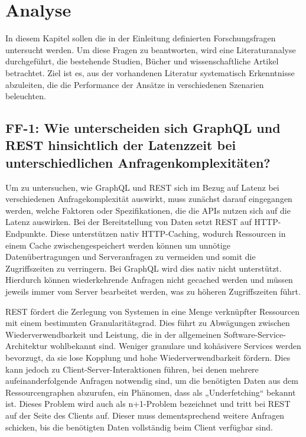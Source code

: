 \chapter{Analyse} %
\label{sec:analyse}
In diesem Kapitel sollen die in der Einleitung definierten Forschungsfragen untersucht werden. Um diese Fragen zu beantworten, wird eine Literaturanalyse durchgeführt, die bestehende Studien, Bücher und wissenschaftliche Artikel betrachtet. Ziel ist es, aus der vorhandenen Literatur systematisch Erkenntnisse abzuleiten, die die Performance der Ansätze in verschiedenen Szenarien beleuchten.

\section{FF-1: Wie unterscheiden sich GraphQL und REST hinsichtlich der Latenzzeit bei unterschiedlichen Anfragenkomplexitäten?} %
\label{sec:ff1}
Um zu untersuchen, wie GraphQL und REST sich im Bezug auf Latenz bei verschiedenen Anfragekomplexität auswirkt, muss zunächst darauf eingegangen werden, welche Faktoren oder Spezifikationen, die die APIs nutzen sich auf die Latenz auswirken.
Bei der Bereitstellung von Daten setzt REST auf HTTP-Endpunkte. Diese unterstützen nativ HTTP-Caching,  wodurch Ressourcen in einem Cache zwischengespeichert werden können um unnötige Datenübertragungen und Serveranfragen zu vermeiden und somit die Zugriffszeiten zu verringern.
Bei GraphQL wird dies nativ nicht unterstützt. Hierdurch können wiederkehrende Anfragen nicht gecached werden und müssen jeweils immer vom Server bearbeitet werden, was zu höheren Zugriffszeiten führt. \citep{graphqlreplacerest}

\noindent
REST fördert die Zerlegung von Systemen in eine Menge verknüpfter Ressourcen mit einem bestimmten Granularitätsgrad. Dies führt zu Abwägungen zwischen Wiederverwendbarkeit und Leistung, die in der allgemeinen Software-Service-Architektur wohlbekannt sind. Weniger granulare und kohäsivere Services werden bevorzugt, da sie lose Kopplung und hohe Wiederverwendbarkeit fördern. Dies kann jedoch zu Client-Server-Interaktionen führen, bei denen mehrere aufeinanderfolgende Anfragen notwendig sind, um die benötigten Daten aus dem Ressourcengraphen abzurufen, ein Phänomen, dass als „Underfetching“ bekannt ist. Dieses Problem wird auch als n+1-Problem bezeichnet und tritt bei REST auf der Seite des Clients auf. Dieser muss dementsprechend weitere Anfragen schicken, bis die benötigten Daten vollständig beim Client verfügbar sind. \citep{graphqlhealth} \citep{migrategraphql}

